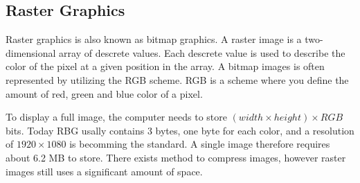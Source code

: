 \subsection{Raster Graphics}
Raster graphics is also known as bitmap graphics.
A raster image is a two-dimensional array of descrete values.
Each descrete value is used to describe the color of the pixel at a given position in the array.
A bitmap images is often represented by utilizing the RGB scheme.
RGB is a scheme where you define the amount of red, green and blue color of a pixel.

To display a full image, the computer needs to store \( (width \times height) \times RGB \) bits.
Today RBG usally contains 3 bytes, one byte for each color,
and a resolution of \(1920 \times 1080\) is becomming the standard.
A single image therefore requires about 6.2 MB to store.
There exists method to compress images, however raster images still uses a significant amount of space.
